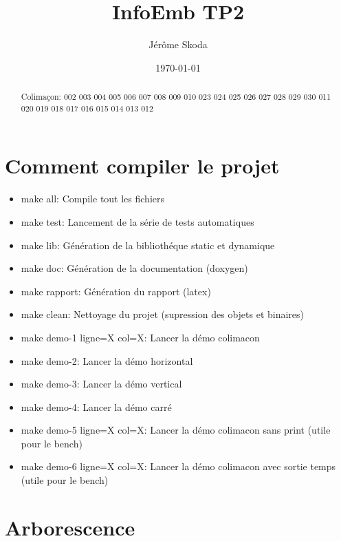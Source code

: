 \documentclass[a4paper]{article}
\title{InfoEmb TP2}
\author{Jérôme Skoda}
\date{\today}
\begin{document}
\maketitle

\begin{abstract}
 Colimaçon:   002  003  004  005  006  007  008  009  010   023  024  025  026  027  028  029  030  011   020  019  018  017  016  015  014  013  012 \newline
\end{abstract}

\section{Comment compiler le projet}

\begin{itemize}
\item make all: Compile tout les fichiers
\item make test: Lancement de la série de tests automatiques
\item make lib: Génération de la bibliothéque static et dynamique
\item make doc: Génération de la documentation (doxygen)
\item make rapport: Génération du rapport (latex)
\item make clean: Nettoyage du projet (supression des objets et binaires)
\item make demo-1 ligne=X col=X: Lancer la démo colimacon
\item make demo-2: Lancer la démo horizontal
\item make demo-3: Lancer la démo vertical
\item make demo-4: Lancer la démo carré
\item make demo-5 ligne=X col=X: Lancer la démo colimacon sans print (utile pour le bench)
\item make demo-6 ligne=X col=X: Lancer la démo colimacon avec sortie temps (utile pour le bench)
\end{itemize}

\section{Arborescence}
\end{document}
